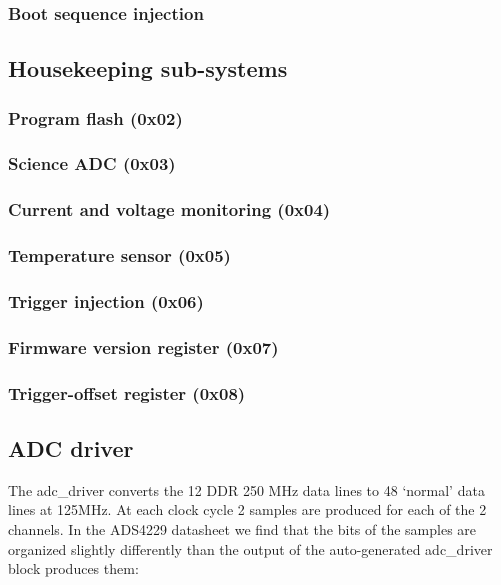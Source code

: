 \documentclass[a4paper,indent]{paper}
\begin{document}
\subsubsection{Boot sequence injection}


\subsection{Housekeeping sub-systems}

\subsubsection{Program flash (0x02)}

\subsubsection{Science \acs{ADC} (0x03)}

\subsubsection{Current and voltage monitoring (0x04)}

\subsubsection{Temperature sensor (0x05)}

\subsubsection{Trigger injection (0x06)}

\subsubsection{Firmware version register (0x07)}

\subsubsection{Trigger-offset register (0x08)}

\subsection{\acs{ADC} driver}
The adc\_driver converts the 12 \ac{DDR} 250 MHz data lines to 48 `normal' data lines at 125MHz.
At each clock cycle 2 samples are produced for each of the 2 channels.
In the ADS4229 datasheet we find that the bits of the samples are organized slightly differently than the output of the auto-generated adc\_driver block produces them:
\end{document}
